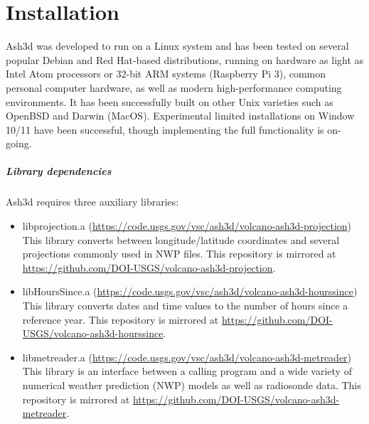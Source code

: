 \chapter{Installation}\label{ChapInstall}
Ash3d was developed to run on a Linux system and has been tested on several
popular Debian and Red Hat-based distributions, running on hardware as light
as Intel Atom processors or 32-bit ARM systems (Raspberry Pi 3), common
personal computer hardware, as well as modern high-performance computing
environments.
It has been successfully built on other Unix varieties such as OpenBSD
and Darwin (MacOS). Experimental limited installations on Window 10/11 have been
successful, though implementing the full functionality is on-going.

\paragraph{Library dependencies}
Ash3d requires three auxiliary libraries:
\begin{itemize}
\item libprojection.a (\url{https://code.usgs.gov/vsc/ash3d/volcano-ash3d-projection}) \\
This library converts between longitude/latitude coordinates and several projections
commonly used in NWP files.
This repository is mirrored at \url{https://github.com/DOI-USGS/volcano-ash3d-projection}.

\item libHoursSince.a (\url{https://code.usgs.gov/vsc/ash3d/volcano-ash3d-hourssince}) \\
This library converts dates and time values to the number of hours since a
reference year.
This repository is mirrored at \url{https://github.com/DOI-USGS/volcano-ash3d-hourssince}.

\item libmetreader.a (\url{https://code.usgs.gov/vsc/ash3d/volcano-ash3d-metreader}) \\
This library is an interface between a calling program and a wide variety of
numerical weather prediction (NWP) models as well as radiosonde data.
This repository is mirrored at \url{https://github.com/DOI-USGS/volcano-ash3d-metreader}.

\end{itemize}

